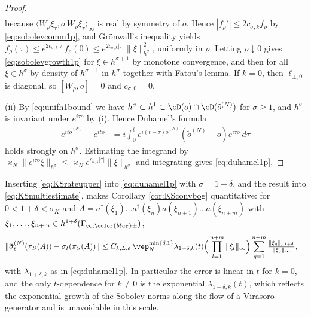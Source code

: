 \documentclass[a4paper, 11pt]{article}
\DeclareMathOperator{\1}{\mathds{1}}
\begin{document}
\begin{proof}
\begin{align*}
\end{align*}
because $\langle W_{\rho}\xi_{\tau},o\!\ W_{\rho}\xi_{\tau}\rangle_{\infty}$ is real by symmetry of $o$. Hence $|f_{\rho}'|\leq2c_{\sigma,k}f_{\rho}$ by \eqref{eq:sobolevcomm1p}, and Gr\"onwall's inequality yields $f_{\rho}(\tau)\leq e^{2c_{\sigma,k}|\tau|}f_{\rho}(0)\leq e^{2c_{\sigma,k}|\tau|}\|\xi\|^{2}_{h^{\sigma}}$, uniformly in $\rho$. Letting $\rho\downarrow0$ gives \eqref{eq:sobolevgrowth1p} for $\xi\in h^{\sigma+1}$ by monotone convergence, and then for all $\xi\in h^{\sigma}$ by density of $h^{\sigma+1}$ in $h^{\sigma}$ together with Fatou's lemma. If $k=0$, then $\ell_{\pm,0}$ is diagonal, so $[W_{\rho},o]=0$ and $c_{\sigma,0}=0$.

(ii) By \eqref{eq:unifh1bound} we have $h^{\sigma}\subset h^{1}\subset\cD(o)\cap\cD(\tilde{o}^{(N)})$ for $\sigma\geq1$, and $h^{\sigma}$ is invariant under $e^{i\tau o}$ by (i). Hence Duhamel's formula
\begin{align*}
e^{it\tilde{o}^{(N)}}-e^{ito} & = i\int_{0}^{t}e^{i(t-\tau)\tilde{o}^{(N)}}(\tilde{o}^{(N)}-o)e^{i\tau o}\!\ d\tau
\end{align*}
holds strongly on $h^{\sigma}$. Estimating the integrand by $\varkappa_{N}\|e^{i\tau o}\xi\|_{h^{\sigma}}\leq\varkappa_{N}e^{c_{\sigma,k}|\tau|}\|\xi\|_{h^{\sigma}}$ and integrating gives \eqref{eq:duhamel1p}.
\end{proof}
Inserting \eqref{eq:KSrateupper} into \eqref{eq:duhamel1p} with $\sigma = 1+\delta$, and the result into \eqref{eq:KSmultiestimate}, makes Corollary \ref{cor:KSconvbog} quantitative: for $0<1+\delta<\sigma_{K}$ and $A = a^{\dagger}(\xi_{1})\dots a^{\dagger}(\xi_{n})a(\xi_{n+1})\dots a(\xi_{n+m})$ with $\xi_{1},\dots,\xi_{n+m}\in h^{1+\delta}(\Gamma_{\infty,{\color{blue}\pm}})$,
\begin{align}
\label{eq:KSconvbograte}
\|\tilde{\sigma}^{(N)}_{t}(\pi_{S}(A)) - \sigma_{t}(\pi_{S}(A))\| & \leq C_{k,L,\delta}\!\ \vep_{N}^{\min\{\delta,1\}}\lambda_{1+\delta,k}(t)\Big(\prod_{l=1}^{n+m}\|\xi_{l}\|_{\infty}\Big)\sum_{q=1}^{n+m}\tfrac{\|\xi_{q}\|_{h^{1+\delta}}}{\|\xi_{q}\|_{\infty}},
\end{align}
with $\lambda_{1+\delta,k}$ as in \eqref{eq:duhamel1p}. In particular the error is linear in $t$ for $k=0$, and the only $t$-dependence for $k\neq0$ is the exponential $\lambda_{1+\delta,k}(t)$, which reflects the exponential growth of the Sobolev norms along the flow of a Virasoro generator and is unavoidable in this scale.
\end{document}

